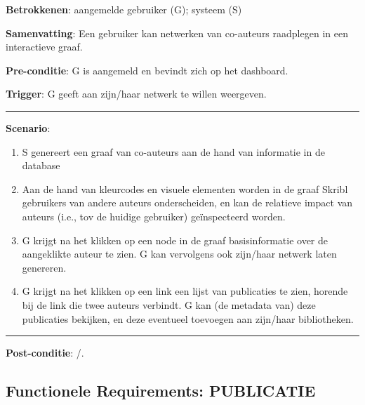 \noindent \textbf{Betrokkenen}: aangemelde gebruiker (G); systeem (S) 
\vspace{2 mm}

\noindent \textbf{Samenvatting}: Een gebruiker kan netwerken van co-auteurs raadplegen in een interactieve graaf. 
\vspace{2 mm}

\noindent \textbf{Pre-conditie}: G is aangemeld en bevindt zich op het dashboard.
\vspace{2 mm}

\noindent \textbf{Trigger}: G geeft aan zijn/haar netwerk te willen weergeven. 

\vspace{4 mm}
\hrule
\vspace{2 mm}
\noindent \textbf{Scenario}:
\begin{enumerate}
\item S genereert een graaf van co-auteurs aan de hand van informatie in de database
\item Aan de hand van kleurcodes en visuele elementen worden in de graaf Skribl gebruikers van andere auteurs onderscheiden, en kan de relatieve impact van auteurs (i.e., tov de huidige gebruiker) ge\"inspecteerd worden. 
\item G krijgt na het klikken op een node in de graaf basisinformatie over de aangeklikte auteur te zien. G kan vervolgens ook zijn/haar netwerk laten genereren.
\item G krijgt na het klikken op een link een lijst van publicaties te zien, horende bij de link die twee auteurs verbindt. G kan (de metadata van) deze publicaties bekijken, en deze eventueel toevoegen aan zijn/haar bibliotheken. 
\end{enumerate}
\vspace{2 mm}
\hrule
\vspace{4 mm}

\noindent \textbf{Post-conditie}: /. \\






\clearpage




\subsection{Functionele Requirements: PUBLICATIE}
\vspace{4 mm}

